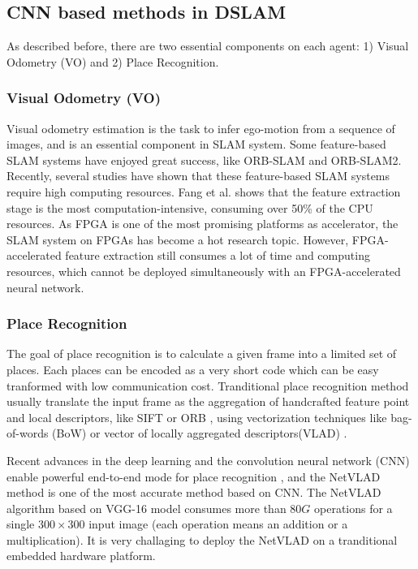 \label{sec:background}
\subsection{CNN based methods in DSLAM}
As described before, there are two essential components on each agent: 1) Visual Odometry (VO) and 2) Place Recognition.

\subsubsection{Visual Odometry (VO)}

Visual odometry estimation is the task to infer ego-motion from a sequence of images, and is an essential component in SLAM system. Some feature-based SLAM systems have enjoyed great success, like ORB-SLAM\cite{DBLP:journals/trob/Mur-ArtalMT15} and ORB-SLAM2\cite{Mur-Artal:2017281}. Recently, several studies have shown that these feature-based SLAM systems require high computing resources. Fang et al.\cite{Fang2017FPGAbasedOF} shows that the feature extraction stage is the most computation-intensive, consuming over 50\% of the CPU resources. As FPGA is one of the most promising platforms as accelerator, the SLAM system on FPGAs has become a hot research topic. However, FPGA-accelerated feature extraction still consumes a lot of time and computing resources, which cannot be deployed simultaneously with an FPGA-accelerated neural network.

\subsubsection{Place Recognition}

The goal of place recognition is to calculate a given frame into a limited set of places. Each places can be encoded as a very short code which can be easy tranformed with low communication cost. Tranditional place recognition method usually translate the input frame as the aggregation of handcrafted feature point and local descriptors, like SIFT \cite{Lowe:2004e6e} or ORB \cite{Mur-Artal:2017281}, using vectorization techniques like bag-of-words (BoW) \cite{Galvez-Lopez:2012c94} or vector of locally aggregated descriptors(VLAD) \cite{Jegou:2010f45}.

Recent advances in the deep learning and the convolution neural network (CNN) enable powerful end-to-end mode for place recognition \cite{Noh:2017d0b,Arandjelovic:2017997}, and the NetVLAD method is one of the most accurate method based on CNN. The NetVLAD algorithm based on VGG-16 model \cite{Simonyan:20143be} consumes more than $80G$ operations for a single $300 \times 300$ input image (each operation means an addition or a multiplication). It is very challaging to deploy the NetVLAD on a tranditional embedded hardware platform.

